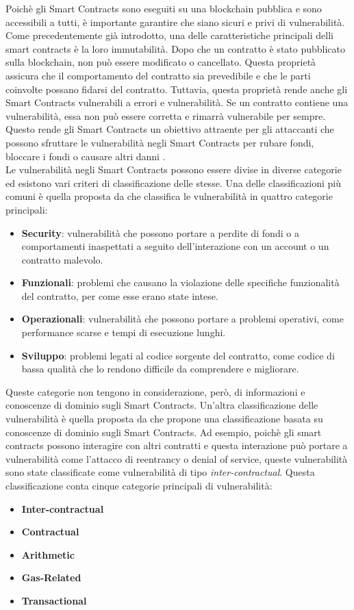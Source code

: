 \documentclass[../../Thesis.tex]{subfiles}
\begin{document}
Poichè gli Smart Contracts sono eseguiti su una blockchain pubblica e sono accessibili a tutti, è importante garantire che siano sicuri e privi di vulnerabilità. Come precedentemente già introdotto, una delle caratteristiche principali delli smart contracts è la loro immutabilità. Dopo che un contratto è stato pubblicato sulla blockchain, non può essere modificato o cancellato. Questa proprietà assicura che il comportamento del contratto sia prevedibile e che le parti coinvolte possano fidarsi del contratto. Tuttavia, questa proprietà rende anche gli Smart Contracts vulnerabili a errori e vulnerabilità. Se un contratto contiene una vulnerabilità, essa non può essere corretta e rimarrà vulnerabile per sempre. Questo rende gli Smart Contracts un obiettivo attraente per gli attaccanti che possono sfruttare le vulnerabilità negli Smart Contracts per rubare fondi, bloccare i fondi o causare altri danni \cite{SCEnhancement}.\\
Le vulnerabilità negli Smart Contracts possono essere divise in diverse categorie ed esistono vari criteri di classificazione delle stesse. Una delle classificazioni più comuni è quella proposta da \cite{SmartCheck} che classifica le vulnerabilità in quattro categorie principali:
\begin{itemize}
    \item \textbf{Security}: vulnerabilità che possono portare a perdite di fondi o a comportamenti inaspettati a seguito dell'interazione con un account o un contratto malevolo.
    \item \textbf{Funzionali}: problemi che causano la violazione delle specifiche funzionalità del contratto, per come esse erano state intese.
    \item \textbf{Operazionali}: vulnerabilità che possono portare a problemi operativi, come performance scarse e tempi di esecuzione lunghi.
    \item \textbf{Sviluppo}: problemi legati al codice sorgente del contratto, come codice di bassa qualità che lo rendono difficile da comprendere e migliorare.
\end{itemize}
Queste categorie non tengono in considerazione, però, di informazioni e conoscenze di dominio sugli Smart Contracts. Un'altra classificazione delle vulnerabilità è quella proposta da \cite{sc-vulnerabilities} che propone una classificazione basata su conoscenze di dominio sugli Smart Contracts. Ad esempio, poichè gli smart contracts possono interagire con altri contratti e questa interazione può portare a vulnerabilità come l'attacco di reentrancy o denial of service, queste vulnerabilità sono state classificate come vulnerabilità di tipo \emph{inter-contractual}. Questa classificazione conta cinque categorie principali di vulnerabilità: 
\begin{itemize}
    \item \textbf{Inter-contractual}
    \item \textbf{Contractual}
    \item \textbf{Arithmetic}
    \item \textbf{Gas-Related}
    \item \textbf{Transactional}
\end{itemize}
\end{document}
